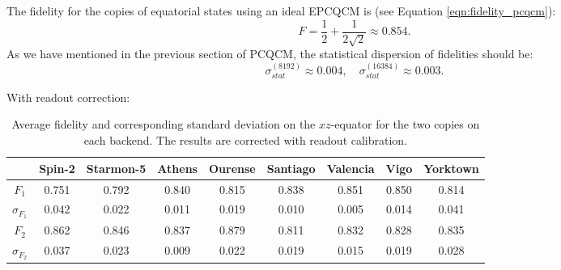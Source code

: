 The fidelity for the copies of equatorial states using an ideal EPCQCM is (see Equation \ref{eqn:fidelity_pcqcm}):
\[
  F=\frac{1}{2}+\frac{1}{2\sqrt{2}}\approx0.854.
\]
As we have mentioned in the previous section of PCQCM, the statistical dispersion of fidelities should be: 
\[
    \sigma_{stat}^{(8192)}\approx 0.004, \quad \sigma_{stat}^{(16384)}\approx 0.003.
\]

With readout correction:
\begin{table}[H]
    \centering
    \begin{tabular}{|c|c|c|c|c|c|c|c|c|}
    \hline
    \textbf{} & \textbf{Spin-2} & \textbf{Starmon-5} & \textbf{Athens} & \textbf{Ourense} & \textbf{Santiago} & \textbf{Valencia} & \textbf{Vigo} & \textbf{Yorktown} \\ \hline
    $F_1$              & 0.751 & 0.792 & 0.840 & 0.815 & 0.838 & 0.851 & 0.850 & 0.814 \\ \hline
    $\sigma_{F_1}$     & 0.042 & 0.022 & 0.011 & 0.019 & 0.010 & 0.005 & 0.014 & 0.041 \\ \hline
    $F_2$              & 0.862 & 0.846 & 0.837 & 0.879 & 0.811 & 0.832 & 0.828 & 0.835 \\ \hline
    $\sigma_{F_2}$     & 0.037 & 0.023 & 0.009 & 0.022 & 0.019 & 0.015 & 0.019 & 0.028 \\ \hline
    \end{tabular}
    \caption{Average fidelity and corresponding standard deviation on the $xz$-equator for the two copies on each backend. The results are corrected with readout calibration.}
    \label{tab:results_epcqcm_onlyequator_corrected}
\end{table}


